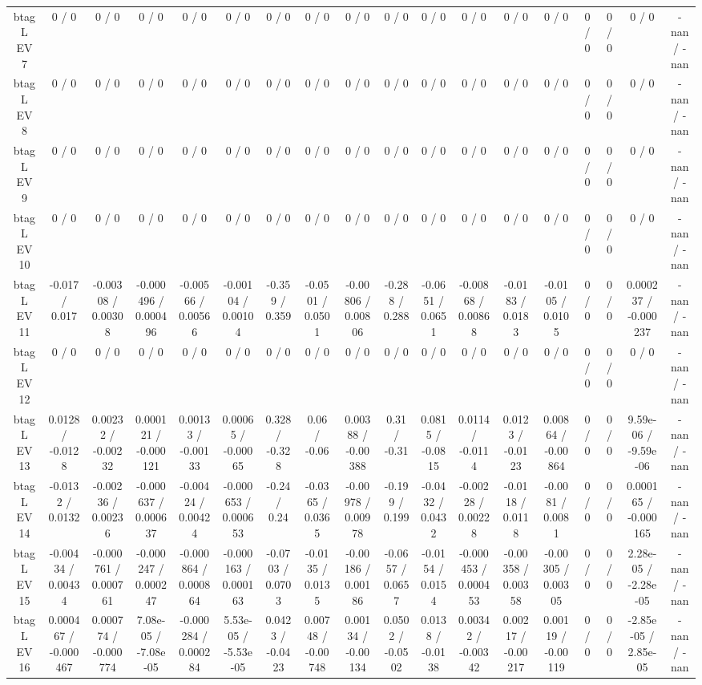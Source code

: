 \documentclass[10pt]{article}
\begin{document}
\begin{table}[htbp]
\begin{center}
\begin{tabular}{|c|c|c|c|c|c|c|c|c|c|c|c|c|c|c|c|c|c|}
  btag L EV 7 & 0 / 0 & 0 / 0 & 0 / 0 & 0 / 0 & 0 / 0 & 0 / 0 & 0 / 0 & 0 / 0 & 0 / 0 & 0 / 0 & 0 / 0 & 0 / 0 & 0 / 0 & 0 / 0 & 0 / 0 & 0 / 0 & -nan / -nan \\ 
  btag L EV 8 & 0 / 0 & 0 / 0 & 0 / 0 & 0 / 0 & 0 / 0 & 0 / 0 & 0 / 0 & 0 / 0 & 0 / 0 & 0 / 0 & 0 / 0 & 0 / 0 & 0 / 0 & 0 / 0 & 0 / 0 & 0 / 0 & -nan / -nan \\ 
  btag L EV 9 & 0 / 0 & 0 / 0 & 0 / 0 & 0 / 0 & 0 / 0 & 0 / 0 & 0 / 0 & 0 / 0 & 0 / 0 & 0 / 0 & 0 / 0 & 0 / 0 & 0 / 0 & 0 / 0 & 0 / 0 & 0 / 0 & -nan / -nan \\ 
  btag L EV 10 & 0 / 0 & 0 / 0 & 0 / 0 & 0 / 0 & 0 / 0 & 0 / 0 & 0 / 0 & 0 / 0 & 0 / 0 & 0 / 0 & 0 / 0 & 0 / 0 & 0 / 0 & 0 / 0 & 0 / 0 & 0 / 0 & -nan / -nan \\ 
  btag L EV 11 & -0.017 / 0.017 & -0.00308 / 0.00308 & -0.000496 / 0.000496 & -0.00566 / 0.00566 & -0.00104 / 0.00104 & -0.359 / 0.359 & -0.0501 / 0.0501 & -0.00806 / 0.00806 & -0.288 / 0.288 & -0.0651 / 0.0651 & -0.00868 / 0.00868 & -0.0183 / 0.0183 & -0.0105 / 0.0105 & 0 / 0 & 0 / 0 & 0.000237 / -0.000237 & -nan / -nan \\ 
  btag L EV 12 & 0 / 0 & 0 / 0 & 0 / 0 & 0 / 0 & 0 / 0 & 0 / 0 & 0 / 0 & 0 / 0 & 0 / 0 & 0 / 0 & 0 / 0 & 0 / 0 & 0 / 0 & 0 / 0 & 0 / 0 & 0 / 0 & -nan / -nan \\ 
  btag L EV 13 & 0.0128 / -0.0128 & 0.00232 / -0.00232 & 0.000121 / -0.000121 & 0.00133 / -0.00133 & 0.00065 / -0.00065 & 0.328 / -0.328 & 0.06 / -0.06 & 0.00388 / -0.00388 & 0.31 / -0.31 & 0.0815 / -0.0815 & 0.0114 / -0.0114 & 0.0123 / -0.0123 & 0.00864 / -0.00864 & 0 / 0 & 0 / 0 & 9.59e-06 / -9.59e-06 & -nan / -nan \\ 
  btag L EV 14 & -0.0132 / 0.0132 & -0.00236 / 0.00236 & -0.000637 / 0.000637 & -0.00424 / 0.00424 & -0.000653 / 0.000653 & -0.24 / 0.24 & -0.0365 / 0.0365 & -0.00978 / 0.00978 & -0.199 / 0.199 & -0.0432 / 0.0432 & -0.00228 / 0.00228 & -0.0118 / 0.0118 & -0.0081 / 0.0081 & 0 / 0 & 0 / 0 & 0.000165 / -0.000165 & -nan / -nan \\ 
  btag L EV 15 & -0.00434 / 0.00434 & -0.000761 / 0.000761 & -0.000247 / 0.000247 & -0.000864 / 0.000864 & -0.000163 / 0.000163 & -0.0703 / 0.0703 & -0.0135 / 0.0135 & -0.00186 / 0.00186 & -0.0657 / 0.0657 & -0.0154 / 0.0154 & -0.000453 / 0.000453 & -0.00358 / 0.00358 & -0.00305 / 0.00305 & 0 / 0 & 0 / 0 & 2.28e-05 / -2.28e-05 & -nan / -nan \\ 
  btag L EV 16 & 0.000467 / -0.000467 & 0.000774 / -0.000774 & 7.08e-05 / -7.08e-05 & -0.000284 / 0.000284 & 5.53e-05 / -5.53e-05 & 0.0423 / -0.0423 & 0.00748 / -0.00748 & 0.00134 / -0.00134 & 0.0502 / -0.0502 & 0.0138 / -0.0138 & 0.00342 / -0.00342 & 0.00217 / -0.00217 & 0.00119 / -0.00119 & 0 / 0 & 0 / 0 & -2.85e-05 / 2.85e-05 & -nan / -nan \\ 

\end{tabular}
\end{center}
\end{table}
\end{document}
